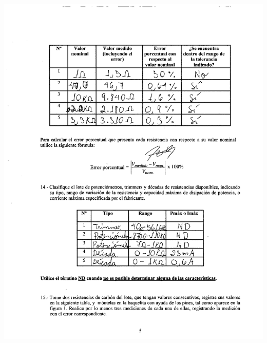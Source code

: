 \documentclass[12pt]{article}
\begin{document}
	\includegraphics[width=15cm,height=20cm]{anexo4}\\
	
\end{document}

